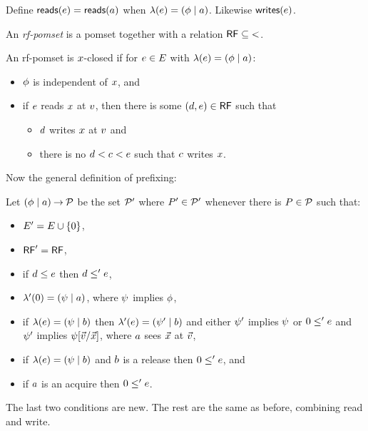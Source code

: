 Define $\mathsf{reads}(e) = \mathsf{reads}(a)$ when $\lambda(e) = (\phi \mid a)$.
Likewise $\mathsf{writes}(e)$.
\begin{definition}
  An \emph{rf-pomset} is a pomset together with a relation
  $\mathord{\mathsf{RF}} \subseteq \mathord{<}$.
\end{definition}
\begin{definition}
  An rf-pomset is $x$-closed if
  for $e\in E$ with $\lambda(e)=(\phi \mid a)$:
  \begin{itemize}
  \item $\phi$ is independent of $x$, and
  \item if $e$ reads $x$ at $v$, then there is some
    $(d,e) \in \mathsf{RF}$ such that
    \begin{itemize}
    \item $d$ writes $x$ at $v$ and
    \item there is no $d < c < e$ such that $c$ writes $x$.
    \end{itemize}
  \end{itemize}
\end{definition}

Now the general definition of prefixing:

Let $(\phi \mid a) \mathbin\rightarrow \mathcal{P}$ be the set $\mathcal{P}'$ where
$P'\in\mathcal{P}'$ whenever there is $P\in\mathcal{P}$ such that:
\begin{itemize}
\item $E' = E \cup \{0\}$,
\item $\mathsf{RF}' = \mathsf{RF}$,
\item if $d \le e$ then $d \le' e$,
\item $\lambda'(0) = (\psi \mid a)$, where $\psi$ implies $\phi$, 
\item if $\lambda(e) = (\psi \mid b)$ then
  $\lambda'(e) = (\psi' \mid b)$ and either $\psi'$ implies
  $\psi$ or
  $0 \le' e$ and $\psi'$ implies $\psi[\vec{v}/\vec{x}]$,
  where $a$ sees $\vec{x}$ at $\vec{v}$,
\item if $\lambda(e) = (\psi \mid b)$ and $b$ is a release then $0
  \le' e$, and
\item if $a$ is an acquire then $0 \le' e$.  
\end{itemize}
The last two conditions are new.  The rest are the same as before, combining
read and write.   



